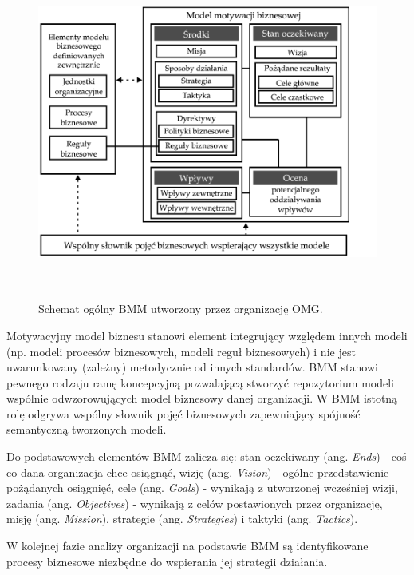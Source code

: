\begin{figure}[h!tbp]
\begin{centering}
\includegraphics[width=12cm, height=11cm]{img/BMM_PL.png}
\caption[Schemat ogólny BMM utworzony przez organizację OMG.]{Schemat ogólny BMM utworzony przez organizację OMG. \cite{BMMOmg}}\label{BMM_schem}
\end{centering}
\end{figure}

Motywacyjny model biznesu stanowi element integrujący względem innych modeli (np. modeli procesów biznesowych, modeli reguł biznesowych) i nie jest uwarunkowany (zależny) metodycznie od innych standardów. BMM stanowi pewnego rodzaju ramę koncepcyjną pozwalającą stworzyć repozytorium modeli wspólnie odwzorowujących model biznesowy danej organizacji. W BMM istotną rolę odgrywa wspólny słownik pojęć biznesowych zapewniający spójność semantyczną tworzonych modeli.

Do podstawowych elementów BMM zalicza się: stan oczekiwany (ang. \emph{Ends}) - coś co dana organizacja chce osiągnąć, wizję (ang. \emph{Vision}) - ogólne przedstawienie pożądanych osiągnięć, cele (ang. \emph{Goals}) - wynikają z utworzonej wcześniej wizji, zadania (ang. \emph{Objectives}) - wynikają z celów postawionych przez organizację, misję (ang. \emph{Mission}), strategie (ang. \emph{Strategies}) i taktyki (ang. \emph{Tactics}). \cite{AnaWesHal}

W kolejnej fazie analizy organizacji na podstawie BMM są identyfikowane procesy biznesowe niezbędne do wspierania jej strategii działania. 

